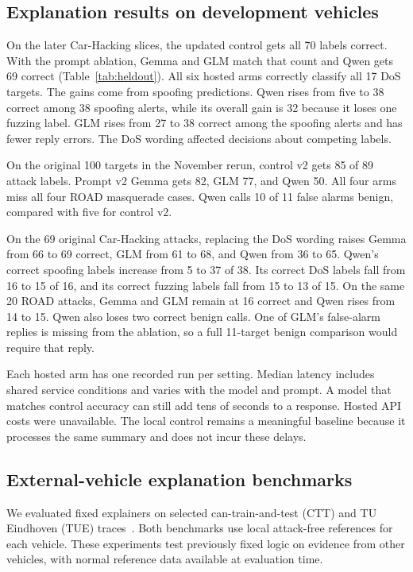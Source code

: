\documentclass[sigconf,pbalance=true]{acmart}
\begin{document}
\subsection{Explanation results on development vehicles}

On the later Car-Hacking slices, the updated control gets all 70 labels correct. With the prompt ablation, Gemma and GLM match that count and Qwen gets 69 correct (Table~\ref{tab:heldout}). All six hosted arms correctly classify all 17 DoS targets. The gains come from spoofing predictions. Qwen rises from five to 38 correct among 38 spoofing alerts, while its overall gain is 32 because it loses one fuzzing label. GLM rises from 27 to 38 correct among the spoofing alerts and has fewer reply errors. The DoS wording affected decisions about competing labels.

On the original 100 targets in the November rerun, control v2 gets 85 of 89 attack labels. Prompt v2 Gemma gets 82, GLM 77, and Qwen 50. All four arms miss all four ROAD masquerade cases. Qwen calls 10 of 11 false alarms benign, compared with five for control v2.

On the 69 original Car-Hacking attacks, replacing the DoS wording raises Gemma from 66 to 69 correct, GLM from 61 to 68, and Qwen from 36 to 65. Qwen's correct spoofing labels increase from 5 to 37 of 38. Its correct DoS labels fall from 16 to 15 of 16, and its correct fuzzing labels fall from 15 to 13 of 15. On the same 20 ROAD attacks, Gemma and GLM remain at 16 correct and Qwen rises from 14 to 15. Qwen also loses two correct benign calls. One of GLM's false-alarm replies is missing from the ablation, so a full 11-target benign comparison would require that reply.

Each hosted arm has one recorded run per setting. Median latency includes shared service conditions and varies with the model and prompt. A model that matches control accuracy can still add tens of seconds to a response. Hosted API costs were unavailable. The local control remains a meaningful baseline because it processes the same summary and does not incur these delays.

\subsection{External-vehicle explanation benchmarks}

We evaluated fixed explainers on selected can-train-and-test (CTT) and TU Eindhoven (TUE) traces~\cite{lampe2024ctt,cttdataset,dupont2019tue}. Both benchmarks use local attack-free references for each vehicle. These experiments test previously fixed logic on evidence from other vehicles, with normal reference data available at evaluation time.
\end{document}
